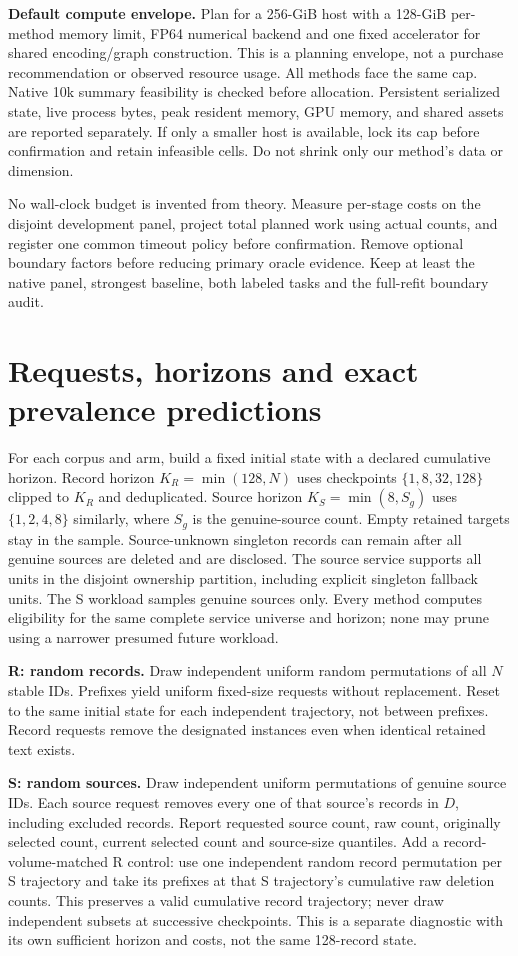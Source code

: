 \documentclass[11pt,a4paper]{article}
\begin{document}
\textbf{Default compute envelope.} Plan for a 256-GiB host with a 128-GiB per-method memory limit, FP64 numerical backend and one fixed accelerator for shared encoding/graph construction. This is a planning envelope, not a purchase recommendation or observed resource usage. All methods face the same cap. Native 10k summary feasibility is checked before allocation. Persistent serialized state, live process bytes, peak resident memory, GPU memory, and shared assets are reported separately. If only a smaller host is available, lock its cap before confirmation and retain infeasible cells. Do not shrink only our method's data or dimension.

No wall-clock budget is invented from theory. Measure per-stage costs on the disjoint development panel, project total planned work using actual counts, and register one common timeout policy before confirmation. Remove optional boundary factors before reducing primary oracle evidence. Keep at least the native panel, strongest baseline, both labeled tasks and the full-refit boundary audit.

\section{Requests, horizons and exact prevalence predictions}
For each corpus and arm, build a fixed initial state with a declared cumulative horizon. Record horizon $K_R=\min(128,N)$ uses checkpoints $\{1,8,32,128\}$ clipped to $K_R$ and deduplicated. Source horizon $K_S=\min(8,S_g)$ uses $\{1,2,4,8\}$ similarly, where $S_g$ is the genuine-source count. Empty retained targets stay in the sample. Source-unknown singleton records can remain after all genuine sources are deleted and are disclosed. The source service supports all units in the disjoint ownership partition, including explicit singleton fallback units. The S workload samples genuine sources only. Every method computes eligibility for the same complete service universe and horizon; none may prune using a narrower presumed future workload.

\textbf{R: random records.} Draw independent uniform random permutations of all $N$ stable IDs. Prefixes yield uniform fixed-size requests without replacement. Reset to the same initial state for each independent trajectory, not between prefixes. Record requests remove the designated instances even when identical retained text exists.

\textbf{S: random sources.} Draw independent uniform permutations of genuine source IDs. Each source request removes every one of that source's records in $D$, including excluded records. Report requested source count, raw count, originally selected count, current selected count and source-size quantiles. Add a record-volume-matched R control: use one independent random record permutation per S trajectory and take its prefixes at that S trajectory's cumulative raw deletion counts. This preserves a valid cumulative record trajectory; never draw independent subsets at successive checkpoints. This is a separate diagnostic with its own sufficient horizon and costs, not the same 128-record state.
\end{document}
